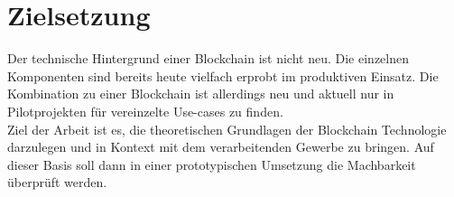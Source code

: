 \section{Zielsetzung}

Der technische Hintergrund einer Blockchain ist nicht neu. Die einzelnen Komponenten sind bereits heute vielfach erprobt im produktiven Einsatz. \cite{Diffie1976}\cite{Steinmetz2005} Die Kombination zu einer Blockchain ist allerdings neu und aktuell nur in Pilotprojekten für vereinzelte Use-cases zu finden.\\

Ziel der Arbeit ist es, die theoretischen Grundlagen der Blockchain Technologie darzulegen und in Kontext mit dem verarbeitenden Gewerbe zu bringen. Auf dieser Basis soll dann in einer prototypischen Umsetzung die Machbarkeit überprüft werden.\\

\newpage
